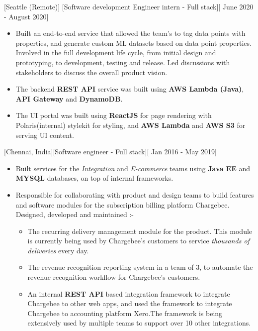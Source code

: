 \documentclass{article}
\begin{document}
[\normalfont{}Seattle (Remote)]
[Software development Engineer intern - Full stack][\normalfont{} June 2020 - August 2020]
\vspace{0.25cm}
\begin{itemize}
\item Built an end-to-end service that allowed the team's to tag data points with properties, and generate custom ML datasets based 
on data point properties. Involved in the full development life cycle, from initial design and prototyping, to development, testing and release. 
Led discussions with stakeholders to discuss the overall product vision.
\item The backend \textbf{REST API} service was built using \textbf{AWS Lambda (Java)}, \textbf{API Gateway} and \textbf{DynamoDB}.
\item The UI portal was built using \textbf{ReactJS} for page rendering with Polaris(internal) stylekit for styling, and \textbf{AWS Lambda} 
and \textbf{AWS S3} for serving UI content.


\end{itemize}

[\normalfont{}Chennai, India][Software engineer - Full stack][\normalfont{} Jan 2016 - May 2019]
\vspace{0.25cm}
\begin{itemize}
\item Built services for the  \emph{Integration} and \emph{E-commerce} teams using \textbf{Java EE} and \textbf{MYSQL} databases, 
on top of internal frameworks.
\item Responsible for collaborating with product and design teams to build features 
and software modules for the subscription billing platform Chargebee. Designed, developed and maintained :-
\begin{itemize}
\item The recurring delivery management module for the product. This module is currently being used by Chargebee’s customers to 
service \emph{thousands of deliveries} every day.
\item The revenue recognition reporting system in a team of 3, to automate the revenue recognition workflow for 
Chargebee’s customers.
\item An internal \textbf{REST API} based integration framework to integrate Chargebee to other web apps, and used the framework to integrate 
Chargebee to accounting platform Xero.The framework is being extensively used by multiple teams to support over 10 other integrations.
\end{itemize}
\end{itemize}
\end{document}
